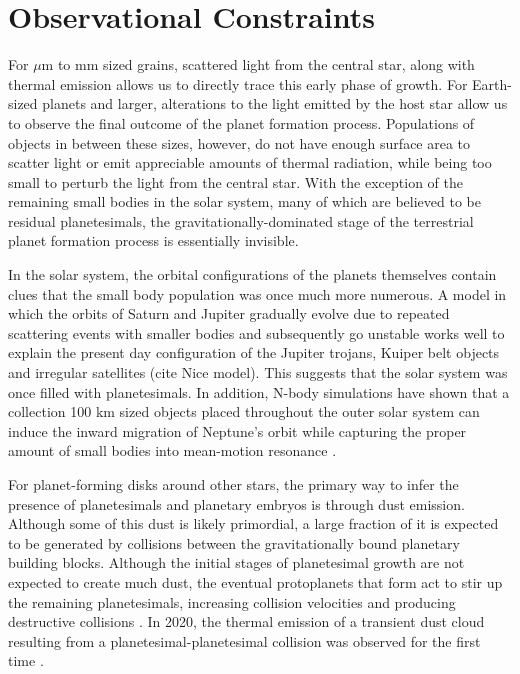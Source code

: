 \section{Observational Constraints}

For $\mu$m to mm sized grains, scattered light from the central star, along with thermal emission allows us to directly trace this early phase of growth. For Earth-sized planets and larger, alterations to the light emitted by the host star allow us to observe the final outcome of the planet formation process. Populations of objects in between these sizes, however, do not have enough surface area to scatter light or emit appreciable amounts of thermal radiation, while being too small to perturb the light from the central star. With the exception of the remaining small bodies in the solar system, many of which are believed to be residual planetesimals, the gravitationally-dominated stage of the terrestrial planet formation process is essentially invisible.

In the solar system, the orbital configurations of the planets themselves contain clues that the small body population was once much more numerous. A model in which the orbits of Saturn and Jupiter gradually evolve due to repeated scattering events with smaller bodies and subsequently go unstable works well to explain the present day configuration of the Jupiter trojans, Kuiper belt objects and irregular satellites (cite Nice model). This suggests that the solar system was once filled with planetesimals. In addition, N-body simulations have shown that a collection 100 km sized objects placed throughout the outer solar system can induce the inward migration of Neptune's orbit while capturing the proper amount of small bodies into mean-motion resonance \cite{murrayclay06}.

For planet-forming disks around other stars, the primary way to infer the presence of planetesimals and planetary embryos is through dust emission. Although some of this dust is likely primordial, a large fraction of it is expected to be generated by collisions between the gravitationally bound planetary building blocks. Although the initial stages of planetesimal growth are not expected to create much dust, the eventual protoplanets that form act to stir up the remaining planetesimals, increasing collision velocities and producing destructive collisions \cite{kenyon04}. In 2020, the thermal emission of a transient dust cloud resulting from a planetesimal-planetesimal collision was observed for the first time \cite{gaspar20}.

